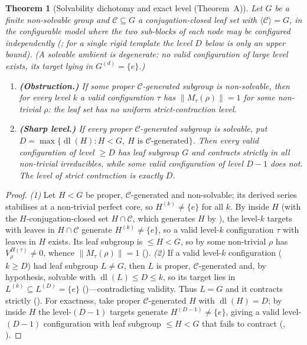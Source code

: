 \documentclass[11pt]{amsart}
\newtheorem{theorem}{Theorem}[section]
\theoremstyle{definition}
\theoremstyle{remark}
\theoremstyle{plain}
\theoremstyle{plain}
\numberwithin{equation}{section}
\newcommand{\norm}[1]{\lVert #1 \rVert}
\newcommand{\opn}[1]{\norm{#1}}
\begin{document}
\begin{theorem}[Solvability dichotomy and exact level (Theorem~A)]
\label{thm:dichotomy}
Let $G$ be a finite \emph{non-solvable} group and $\mathcal{C}\subseteq G$ a
conjugation-closed leaf set with $\langle\mathcal{C}\rangle=G$, in the \emph{configurable} model
where the two sub-blocks of each node may be configured independently (; for
a single rigid template the level $D$ below is only an upper bound). {\normalfont(A solvable
ambient is degenerate: no valid configuration of large level exists, its target lying in
$G^{(d)}=\{e\}$.)}
\begin{enumerate}[nosep,leftmargin=1.6em]
\item\textbf{(Obstruction.)} If some proper $\mathcal{C}$-generated subgroup is
non-solvable, then for every level $k$ a valid configuration $\tau$ has $\opn{M_\tau(\rho)}=1$
for some non-trivial $\rho$: the leaf set has \emph{no uniform strict-contraction level}.
\item\textbf{(Sharp level.)} If every proper $\mathcal{C}$-generated subgroup is solvable,
put $D=\max\{\operatorname{dl}(H):H<G,\ H\text{ is }\mathcal{C}\text{-generated}\}$. Then
every valid configuration of level $\ge D$ has leaf subgroup $G$ and contracts strictly in
all non-trivial irreducibles, while some valid configuration of level $D-1$ does not. The
level of strict contraction is exactly $D$.
\end{enumerate}
\end{theorem}
\begin{proof}
\emph{(1)} Let $H<G$ be proper, $\mathcal{C}$-generated and non-solvable; its derived
series stabilises at a non-trivial perfect core, so $H^{(k)}\neq\{e\}$ for all $k$. By
 inside $H$ (with the $H$-conjugation-closed set $H\cap\mathcal{C}$,
which generates $H$ by ), the level-$k$ targets with leaves in
$H\cap\mathcal{C}$ generate $H^{(k)}\neq\{e\}$, so a valid level-$k$ configuration $\tau$ with
leaves in $H$ exists. Its leaf subgroup is $\le H<G$, so by  some
non-trivial $\rho$ has $V_\rho^{H(\tau)}\neq0$, whence
$\opn{M_\tau(\rho)}=1$ (). \emph{(2)} If a valid level-$k$ configuration
($k\ge D$) had leaf subgroup $L\neq G$, then $L$ is proper, $\mathcal{C}$-generated and,
by hypothesis, solvable with $\operatorname{dl}(L)\le D\le k$, so its target lies in
$L^{(k)}\subseteq L^{(D)}=\{e\}$ ()---contradicting validity. Thus $L=G$
and it contracts strictly (). For exactness, take proper
$\mathcal{C}$-generated $H$ with $\operatorname{dl}(H)=D$; by  inside $H$
the level-$(D-1)$ targets generate $H^{(D-1)}\neq\{e\}$, giving a valid level-$(D-1)$
configuration with leaf subgroup $\le H<G$ that fails to contract (,
).
\end{proof}
\end{document}
